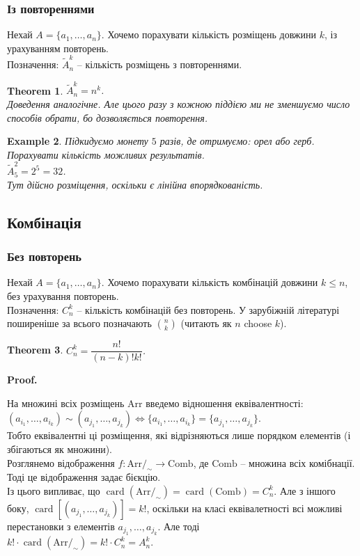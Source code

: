 \documentclass[a4paper, 14pt]{extarticle}
\makeatletter
\theoremstyle{theoremdd}
\newtheorem{theorem}{Theorem}[subsection]
\theoremstyle{theoremdd}
\theoremstyle{theoremdd}
\theoremstyle{theoremdd}
\theoremstyle{theoremdd}
\newtheorem{example}[theorem]{Example}
\theoremstyle{theoremdd}
\theoremstyle{theoremdd}
\theoremstyle{theoremdd}
\theoremstyle{theoremdd}
\theoremstyle{theoremdd}
\theoremstyle{theoremdd}
\theoremstyle{theoremdd}
\theoremstyle{theoremdd}
\theoremstyle{theoremdd}
\theoremstyle{theoremdd}
\renewenvironment{proof}[1][Proof.\\]{\par
\pushQED{\hfill \qed}%
\normalfont \topsep6\p@\@plus6\p@\relax
\trivlist
\item\relax
{\bfseries
#1\@addpunct{.}}\hspace\labelsep\ignorespaces
}{%
\popQED\endtrivlist\@endpefalse
}
\DeclareMathOperator{\card}{card}
\makeatother
\begin{document}
\subsubsection*{Із повтореннями}
Нехай $A = \{a_1,\dots,a_n\}$. Хочемо порахувати кількість розміщень довжини $k$, із урахуванням повторень.\\
Позначення: $\tilde{A}_n^k$ -- кількість розміщень з повтореннями.

\begin{theorem}
$\tilde{A}_n^k = n^k$.\\
\textit{Доведення аналогічне. Але цього разу з кожною піддією ми не зменшуємо число способів обрати, бо дозволяється повторення.}
\end{theorem}

\begin{example}
Підкидуємо монету $5$ разів, де отримуємо: орел або герб. Порахувати кількість можливих результатів.\\
$\tilde{A}_5^2 = 2^5 = 32$.
\bigskip \\
Тут дійсно розміщення, оскільки є лінійна впорядкованість.
\end{example}

\subsection{Комбінація}
\subsubsection*{Без повторень}
Нехай $A = \{a_1,\dots,a_n\}$. Хочемо порахувати кількість комбінацій довжини $k \leq n$, без урахування повторень.\\
Позначення: $C_n^k$ -- кількість комбінацій без повторень. У зарубіжній літературі поширеніше за всього позначають $\binom{n}{k}$ (читають як $n$ choose $k$).

\begin{theorem}
$C_n^k = \dfrac{n!}{(n-k)! k!}$.
\end{theorem}

\begin{proof}
На множині всіх розміщень $\text{Arr}$ введемо відношення еквівалентності:\\
$(a_{i_1},\dots,a_{i_k}) \sim (a_{j_1},\dots,a_{j_k}) \iff \{a_{i_1},\dots,a_{i_k}\} = \{a_{j_1},\dots,a_{j_k}\}$.\\
Тобто еквівалентні ці розміщення, які відрізняються лише порядком елементів (і збігаються як множини). \\
Розглянемо відображення $f \colon \text{Arr}/_\sim \to \text{Comb}$, де $\text{Comb}$ -- множина всіх комібнації. Тоді це відображення задає бієкцію.\\
Із цього випливає, що $\card(\text{Arr}/_\sim) = \card(\text{Comb}) = C_n^k$. Але з іншого боку, $\card [(a_{j_1},\dots,a_{j_k})] = k!$, оскільки на класі еквівалетності всі можливі перестановки з елементів $a_{j_1},\dots,a_{j_k}$. Але тоді \\ $k! \cdot \card(\text{Arr}/_\sim) = k! \cdot C_n^k = A_n^k$.
\end{proof}
\end{document}
